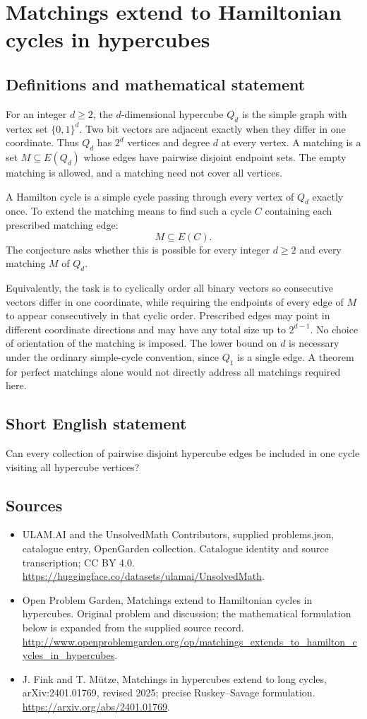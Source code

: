 \documentclass[11pt,a4paper]{article}
\begin{document}
\section*{Matchings extend to Hamiltonian cycles in hypercubes}\label{statement}

\subsection{Definitions and mathematical statement}
For an integer $d\geq2$, the $d$-dimensional hypercube
$Q_d$ is the simple graph with vertex set $\{0,1\}^d$.
Two bit vectors are adjacent exactly when they differ
in one coordinate. Thus $Q_d$ has $2^d$ vertices and
degree $d$ at every vertex. A matching is a set
$M\subseteq E(Q_d)$ whose edges have pairwise disjoint
endpoint sets. The empty matching is allowed, and a
matching need not cover all vertices.

A Hamilton cycle is a simple cycle passing through
every vertex of $Q_d$ exactly once. To extend the
matching means to find such a cycle $C$ containing
each prescribed matching edge:
\[
 M\subseteq E(C).
\]
The conjecture asks whether this is possible for every
integer $d\geq2$ and every matching $M$ of $Q_d$.

Equivalently, the task is to cyclically order all binary
vectors so consecutive vectors differ in one coordinate,
while requiring the endpoints of every edge of $M$ to
appear consecutively in that cyclic order. Prescribed
edges may point in different coordinate directions and
may have any total size up to $2^{d-1}$. No choice of
orientation of the matching is imposed. The lower bound
on $d$ is necessary under the ordinary simple-cycle
convention, since $Q_1$ is a single edge. A theorem for
perfect matchings alone would not directly address all
matchings required here.
\subsection{Short English statement}
Can every collection of pairwise disjoint hypercube edges be included in one cycle visiting all hypercube vertices?
\subsection{Sources}
\begin{itemize}
\item[S1] ULAM.AI and the UnsolvedMath Contributors, supplied problems.json, catalogue entry, OpenGarden collection. Catalogue identity and source transcription; CC BY 4.0.
\url{https://huggingface.co/datasets/ulamai/UnsolvedMath}.
\item[S2] Open Problem Garden, Matchings extend to Hamiltonian cycles in hypercubes. Original problem and discussion; the mathematical formulation below is expanded from the supplied source record.
\url{http://www.openproblemgarden.org/op/matchings_extends_to_hamilton_cycles_in_hypercubes}.
\item[S3] J. Fink and T. Mütze, Matchings in hypercubes extend to long cycles, arXiv:2401.01769, revised 2025; precise Ruskey–Savage formulation.
\url{https://arxiv.org/abs/2401.01769}.
\end{itemize}
\end{document}
